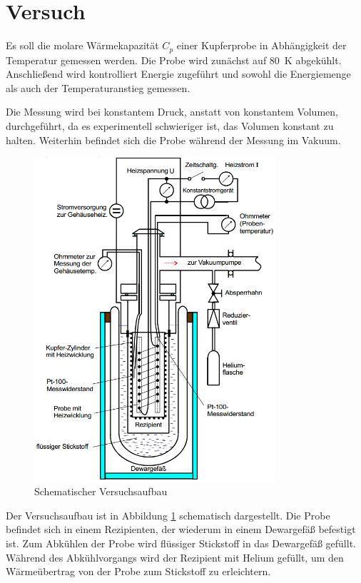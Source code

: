 \section{Versuch}

Es soll die molare Wärmekapazität $C_p$ einer Kupferprobe in Abhängigkeit der Temperatur gemessen werden.
Die Probe wird zunächst auf \SI{80}{\kelvin} abgekühlt.
Anschließend wird kontrolliert Energie zugeführt und sowohl die Energiemenge als auch der Temperaturanstieg gemessen.

Die Messung wird bei konstantem Druck, anstatt von konstantem Volumen, durchgeführt, da es experimentell schwieriger ist, das Volumen konstant zu halten.
Weiterhin befindet sich die Probe während der Messung im Vakuum.

\begin{figure}
	\centering
	\includegraphics[width=0.8\textwidth]{img/aufbau.png}
	\caption{Schematischer Versuchsaufbau \cite{v47}}
	\label{fig:aufbau}
\end{figure}

Der Versuchsaufbau ist in Abbildung \ref{fig:aufbau} schematisch dargestellt.
Die Probe befindet sich in einem Rezipienten, der wiederum in einem Dewargefäß befestigt ist.
Zum Abkühlen der Probe wird flüssiger Stickstoff in das Dewargefäß gefüllt.
Während des Abkühlvorgangs wird der Rezipient mit Helium gefüllt, um den Wärmeübertrag von der Probe zum Stickstoff zu erleichtern.

